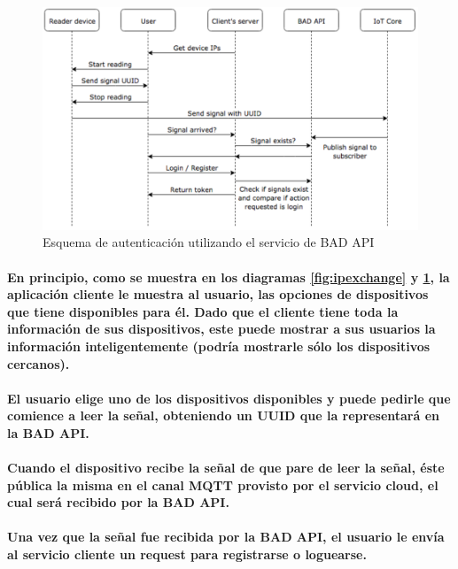 \documentclass{article}
\begin{document}
\begin{figure}[ht]
    \centering
    \includegraphics[width=\textwidth]{authschema.png}%
    \caption{Esquema de autenticación utilizando el servicio de BAD API}
    \label{fig:authschema}
\end{figure}

\paragraph{
En principio, como se muestra en los diagramas \ref{fig:ipexchange} y \ref{fig:authschema}, la aplicación cliente le muestra al usuario, las opciones de dispositivos que tiene disponibles para él. Dado que el cliente tiene toda la información de sus dispositivos, este puede mostrar a sus usuarios la información inteligentemente (podría mostrarle sólo los dispositivos cercanos).
}
\paragraph{
El usuario elige uno de los dispositivos disponibles y puede pedirle que comience a leer la señal, obteniendo un UUID que la representará en la BAD API.
}
\paragraph{
Cuando el dispositivo recibe la señal de que pare de leer la señal, éste pública la misma en el canal MQTT provisto por el servicio cloud, el cual será recibido por la BAD API.
}
\paragraph{
Una vez que la señal fue recibida por la BAD API, el usuario le envía al servicio cliente un request para registrarse o loguearse.
}
\end{document}
